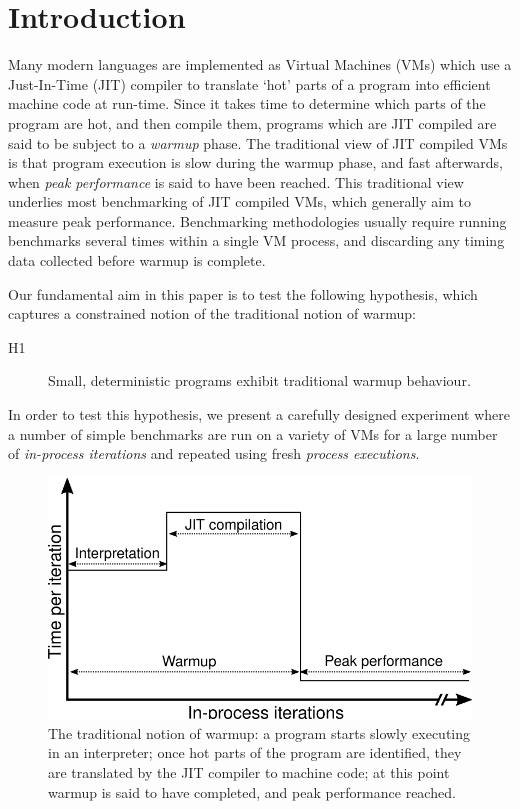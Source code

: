 \documentclass[a4paper,UKenglish]{lipics}
\newcommand{\hypone}{H1\xspace}
\begin{document}
\section{Introduction}
\label{sec:intro}

Many modern languages are implemented as Virtual Machines (VMs) which use a
Just-In-Time (JIT) compiler to translate `hot' parts of a program into efficient
machine code at run-time. Since it takes time to determine which parts of the
program are hot, and then compile them, programs which are JIT compiled are
said to be subject to a \emph{warmup} phase. The traditional view of
JIT compiled VMs is that program execution is slow during the warmup phase, and
fast afterwards, when \emph{peak performance} is said to have been reached.
This traditional view underlies most benchmarking of JIT compiled VMs, which
generally aim to measure peak performance. Benchmarking methodologies usually
require running benchmarks several times within a single VM process, and
discarding any timing data collected before warmup is complete.

Our fundamental aim in this paper is to test the following hypothesis, which captures a constrained
notion of the traditional notion of warmup:
\begin{description}
  \item[\hypone] Small, deterministic programs exhibit traditional warmup behaviour.
\end{description}
In order to test this hypothesis, we present a carefully designed
experiment where a number of simple benchmarks are run on a variety of
VMs for a large number of \emph{in-process iterations} and repeated using fresh
\emph{process executions}.

\begin{figure}[t]
\centering
\includegraphics[width=.5\textwidth]{img/picturebook_warmup}
\caption{The traditional notion of warmup: a program starts slowly executing in
an interpreter; once hot parts of the program are identified, they are
translated by the JIT compiler to machine code; at this point warmup
is said to have completed, and peak performance reached.}
\label{fig:trad}
\end{figure}
\end{document}
